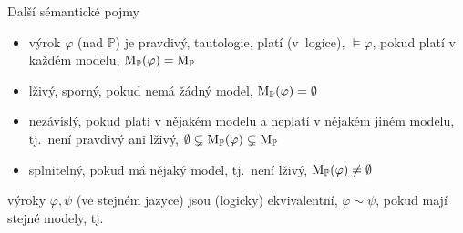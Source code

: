\documentclass{beamer}
\begin{document}
\begin{frame}{Další sémantické pojmy}

    \begin{itemize}
        \item výrok $\varphi$ (nad $\mathbb P$) je \alert{pravdivý}, \alert{tautologie}, \alert{platí (v~logice)}, \alert{$\models \varphi$}, pokud platí v každém modelu, $\operatorname{M}_\mathbb P(\varphi)=\operatorname{M}_\mathbb P$\pause
        \item \alert{lživý}, \alert{sporný}, pokud nemá žádný model, $\operatorname{M}_\mathbb P(\varphi)=\emptyset$\pause
        
        \pause

        \item \alert{nezávislý}, pokud platí v nějakém modelu a neplatí v nějakém jiném modelu, tj.\ není pravdivý ani lživý, $\emptyset\subsetneq\operatorname{M}_\mathbb P(\varphi)\subsetneq\operatorname{M}_\mathbb P$\pause
        \item \alert{splnitelný}, pokud má nějaký model, tj.\ není lživý, $\operatorname{M}_\mathbb P(\varphi)\neq\emptyset$
    \end{itemize}
    \pause
    výroky $\varphi,\psi$ (ve stejném jazyce) jsou \alert{(logicky) ekvivalentní}, \alert{$\varphi\sim\psi$}, pokud mají stejné modely, tj.\

    \pause
    \medskip
    
\end{frame}
\end{document}
